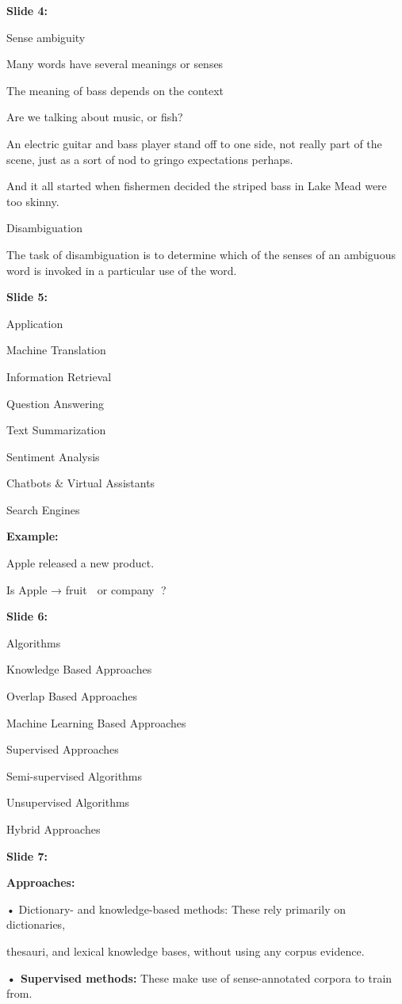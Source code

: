 \documentclass[11pt,a4paper]{article}
\begin{document}
\textbf{Slide 4:}

Sense ambiguity

Many words have several meanings or senses

The meaning of bass depends on the context

Are we talking about music, or fish?

An electric guitar and bass player stand off to one side, not really part of the scene, just as a sort of nod to gringo expectations perhaps.

And it all started when fishermen decided the striped bass in Lake Mead were too skinny.

Disambiguation

The task of disambiguation is to determine which of the senses of an ambiguous word is invoked in a particular use of the word.

\textbf{Slide 5:}

Application

Machine Translation

Information Retrieval

Question Answering

Text Summarization

Sentiment Analysis

Chatbots & Virtual Assistants

Search Engines

\textbf{Example:} 

Apple released a new product.

Is Apple → fruit 🍎 or company 🏢?

\textbf{Slide 6:}

Algorithms

Knowledge Based Approaches

Overlap Based Approaches

Machine Learning Based Approaches

Supervised Approaches

Semi-supervised Algorithms

Unsupervised Algorithms

Hybrid Approaches

\textbf{Slide 7:}

\textbf{Approaches:} 

• Dictionary- and knowledge-based methods: These rely primarily on dictionaries,

thesauri, and lexical knowledge bases, without using any corpus evidence.

\textbf{• Supervised methods:}  These make use of sense-annotated corpora to train from.
\end{document}
